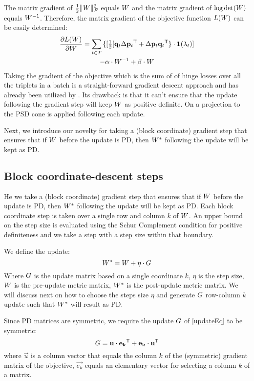\documentclass{article}
\begin{document}
The matrix gradient of $\tfrac{1}{2} \| {W} \|_{F}^{2}$ equals ${W}$ and the matrix gradient of  $\log \det({W})$ equals ${W}^{-1}$. Therefore, the matrix gradient of the objective function $L({W})$ can be easily determined: 
\begin{multline}
\frac{\partial {L ({W})}}{\partial {W}} = 
\sum\limits_{t\in T}{\{ [\tfrac{1}{2}[\mathbf{q}_{t}\Delta\mathbf{p}_{t}{}^\mathsf{T} + \Delta\mathbf{p}_{t}\mathbf{q}_{t}{}^\mathsf{T} \} } \cdot \textbf{1}(\lambda_t)] \\- \alpha \cdot {W}^{-1} + \beta \cdot {W} 
\label{gradMat}
\end{multline}
Taking the gradient of the objective which is the sum of of hinge losses over all the triplets in a batch is a straight-forward gradient descent approach and has already been utilized by \cite{qian}. Its drawback is that it can't ensure that the update following the gradient step will keep ${W}$ as positive definite. On \cite{qian} a projection to the PSD cone is applied following each update. 

Next, we introduce our novelty for taking a (block coordinate) gradient step that ensures that if ${W}$ before the update is PD, then ${{W^*}}$ following the update will be kept as PD. 

\subsection{Block coordinate-descent steps}
He we take a (block coordinate) gradient step that ensures that if ${W}$ before the update is PD, then ${{W^*}}$ following the update will be kept as PD. Each block coordinate step is taken over a single row and column $k$ of ${W}$. An upper bound on the step size is evaluated using the Schur Complement condition for positive definiteness and we take a step with a step size within that boundary. 

We define the update:
\begin{equation}
   {{W^*}} = {W} +\eta\cdot{G}
   \label{updateEq}
\end{equation}
Where ${G}$ is the update matrix based on a single coordinate $k$, $\eta$ is the step size, ${W}$ is the pre-update metric matrix, ${{W^*}}$ is the post-update metric matrix. We will discuss next on how to choose the steps size $\eta$ and generate ${G}$ row-column $k$ update such that ${{W^*}}$ will result as PD. 


Since PD matrices are symmetric, we require the update ${G}$ of \eqref{updateEq} to be symmetric:
\begin{equation}
{G} = \mathbf{u}\cdot\mathbf{e_k}{}^\mathsf{T} + \mathbf{e_k}\cdot\mathbf{u}{}^\mathsf{T}
\label{gradMtx}
\end{equation}
where  $\vec{u}$ is a column vector that equals the column $k$ of the (symmetric) gradient matrix of the objective, $\vec{e_k}$ equals an elementary vector for selecting a column $k$ of a matrix. 
\end{document}
